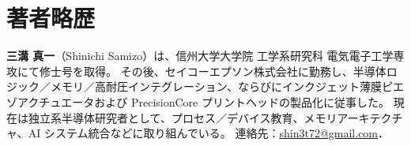 \documentclass[conference]{IEEEtran}
\begin{document}
\section*{著者略歴}
\noindent\textbf{三溝 真一}（Shinichi Samizo）は、信州大学大学院 工学系研究科 電気電子工学専攻にて修士号を取得。
その後、セイコーエプソン株式会社に勤務し、半導体ロジック／メモリ／高耐圧インテグレーション、ならびにインクジェット薄膜ピエゾアクチュエータおよび PrecisionCore プリントヘッドの製品化に従事した。
現在は独立系半導体研究者として、プロセス／デバイス教育、メモリアーキテクチャ、AI システム統合などに取り組んでいる。
連絡先：\href{mailto:shin3t72@gmail.com}{shin3t72@gmail.com}．
\end{document}
